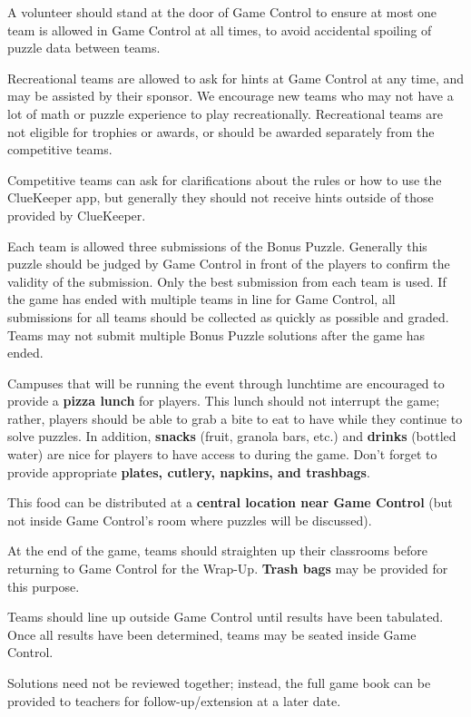 A volunteer should stand at the door of Game Control to ensure at most
one team is allowed in Game Control at all times, to avoid accidental
spoiling of puzzle data between teams. 

Recreational teams are allowed to ask for hints at Game Control at any time,
and may be assisted by their sponsor. We encourage new teams who may
not have a lot of math or puzzle experience to play recreationally.
Recreational teams are not eligible for trophies or awards, or should
be awarded separately from the competitive teams.

Competitive teams can ask for clarifications about the rules or how to 
use the ClueKeeper app, but generally
they should not receive hints outside of those provided by ClueKeeper.

Each team is allowed three submissions of the Bonus Puzzle. Generally this
puzzle should be judged by Game Control in front of the players to confirm
the validity of the submission. 
Only the best submission from each team is used. If the game has ended
with multiple teams in line for Game Control, all submissions for all teams
should be collected as quickly as possible and graded. Teams may not submit
multiple Bonus Puzzle solutions after the game has ended.


Campuses that will be running the event through lunchtime are encouraged to
provide a \textbf{pizza lunch} for players. This lunch should not interrupt the
game; rather, players should be able to grab a bite to eat to have while they
continue to solve puzzles. In addition, \textbf{snacks}
(fruit, granola bars, etc.) and \textbf{drinks} (bottled water) are nice for
players to have access to during the game. Don't forget to provide
appropriate \textbf{plates, cutlery, napkins, and trashbags}.

This food can be distributed at a \textbf{central location near Game Control}
(but not inside Game Control's room where puzzles will be discussed).


At the end of the game, teams should straighten up their classrooms before
returning to Game Control for the Wrap-Up. \textbf{Trash bags} may be
provided for this purpose.

Teams should line up outside Game Control until results have been tabulated.
Once all results have been determined, teams may be seated inside Game Control.

Solutions need not be reviewed together; instead, the full game book can be provided
to teachers for follow-up/extension at a later date.

